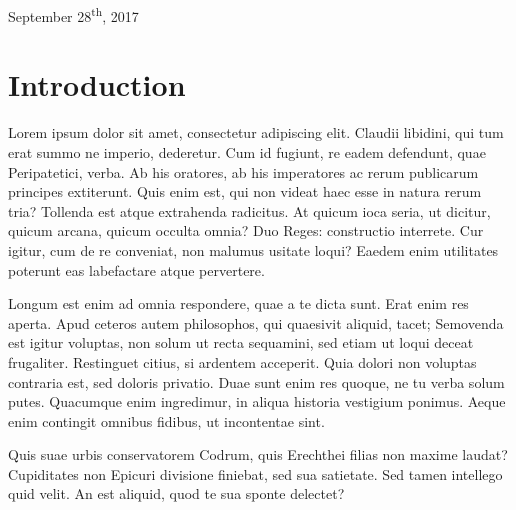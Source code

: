 \documentclass[12pt,twoside]{article}
\begin{document}
\begin{titlepage}
\begin{center}
			
			
			{\large September 28\textsuperscript{th}, 2017}\\
			
			\vfill %
			
		\end{center} %
		
	\end{titlepage} %
	
	\renewcommand{\thepage}{\roman{page}} %
	\newpage %
	\tableofcontents
	\newpage
	\listoffigures
	\newpage
	
	\renewcommand{\thepage}{\arabic{page}}
	\setcounter{page}{1}
		
	\section{Introduction}
	Lorem ipsum dolor sit amet, consectetur adipiscing elit. Claudii libidini, qui tum erat summo ne imperio, dederetur. Cum id fugiunt, re eadem defendunt, quae Peripatetici, verba. Ab his oratores, ab his imperatores ac rerum publicarum principes extiterunt. Quis enim est, qui non videat haec esse in natura rerum tria? Tollenda est atque extrahenda radicitus. At quicum ioca seria, ut dicitur, quicum arcana, quicum occulta omnia? Duo Reges: constructio interrete. Cur igitur, cum de re conveniat, non malumus usitate loqui? Eaedem enim utilitates poterunt eas labefactare atque pervertere.
	
	Longum est enim ad omnia respondere, quae a te dicta sunt. Erat enim res aperta. Apud ceteros autem philosophos, qui quaesivit aliquid, tacet; Semovenda est igitur voluptas, non solum ut recta sequamini, sed etiam ut loqui deceat frugaliter. Restinguet citius, si ardentem acceperit. Quia dolori non voluptas contraria est, sed doloris privatio. Duae sunt enim res quoque, ne tu verba solum putes. Quacumque enim ingredimur, in aliqua historia vestigium ponimus. Aeque enim contingit omnibus fidibus, ut incontentae sint.
	
	Quis suae urbis conservatorem Codrum, quis Erechthei filias non maxime laudat? Cupiditates non Epicuri divisione finiebat, sed sua satietate. Sed tamen intellego quid velit. An est aliquid, quod te sua sponte delectet?
	
\end{document}
